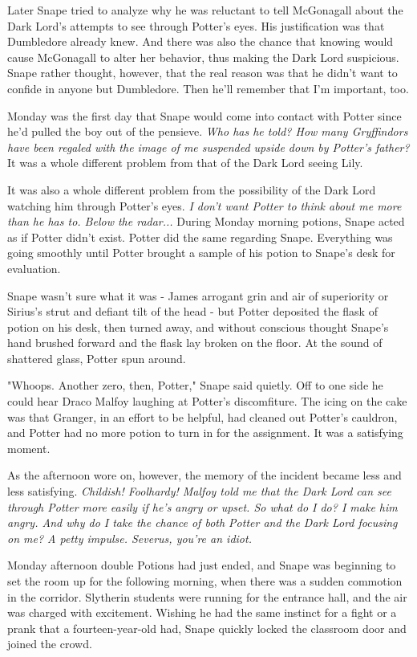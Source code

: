 Later Snape tried to analyze why he was reluctant to tell McGonagall about the Dark Lord's attempts to see through Potter's eyes. His justification was that Dumbledore already knew. And there was also the chance that knowing would cause McGonagall to alter her behavior, thus making the Dark Lord suspicious. Snape rather thought, however, that the real reason was that he didn't want to confide in anyone but Dumbledore. Then he'll remember that I'm important, too.

Monday was the first day that Snape would come into contact with Potter since he'd pulled the boy out of the pensieve. \emph{Who has he told? How many Gryffindors have been regaled with the image of me suspended upside down by Potter's father?} It was a whole different problem from that of the Dark Lord seeing Lily.

It was also a whole different problem from the possibility of the Dark Lord watching him through Potter's eyes. \emph{I don't want Potter to think about me more than he has to. Below the radar...} During Monday morning potions, Snape acted as if Potter didn't exist. Potter did the same regarding Snape. Everything was going smoothly until Potter brought a sample of his potion to Snape's desk for evaluation.

Snape wasn't sure what it was - James arrogant grin and air of superiority or Sirius's strut and defiant tilt of the head - but Potter deposited the flask of potion on his desk, then turned away, and without conscious thought Snape's hand brushed forward and the flask lay broken on the floor. At the sound of shattered glass, Potter spun around.

"Whoops. Another zero, then, Potter," Snape said quietly. Off to one side he could hear Draco Malfoy laughing at Potter's discomfiture. The icing on the cake was that Granger, in an effort to be helpful, had cleaned out Potter's cauldron, and Potter had no more potion to turn in for the assignment. It was a satisfying moment.

As the afternoon wore on, however, the memory of the incident became less and less satisfying. \emph{Childish! Foolhardy! Malfoy told me that the Dark Lord can see through Potter more easily if he's angry or upset. So what do I do? I make him angry. And why do I take the chance of both Potter and the Dark Lord focusing on me? A petty impulse. Severus, you're an idiot.}

Monday afternoon double Potions had just ended, and Snape was beginning to set the room up for the following morning, when there was a sudden commotion in the corridor. Slytherin students were running for the entrance hall, and the air was charged with excitement. Wishing he had the same instinct for a fight or a prank that a fourteen-year-old had, Snape quickly locked the classroom door and joined the crowd.

